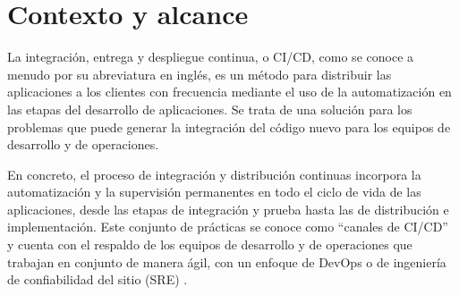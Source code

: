 \section{Contexto y alcance}




La integración, entrega y despliegue continua, o CI/CD, como se conoce a menudo por su abreviatura en inglés, es un método para distribuir las aplicaciones a los clientes con frecuencia mediante el uso de la automatización en las etapas del desarrollo de aplicaciones. Se trata de una solución para los problemas que puede generar la integración del código nuevo para los equipos de desarrollo y de operaciones.

En concreto, el proceso de integración y distribución continuas incorpora la automatización y la supervisión permanentes en todo el ciclo de vida de las aplicaciones, desde las etapas de integración y prueba hasta las de distribución e implementación. Este conjunto de prácticas se conoce como ``canales de CI/CD'' y cuenta con el respaldo de los equipos de desarrollo y de operaciones que trabajan en conjunto de manera ágil, con un enfoque de DevOps o de ingeniería de confiabilidad del sitio (SRE) \cite{redHatCICD}.

